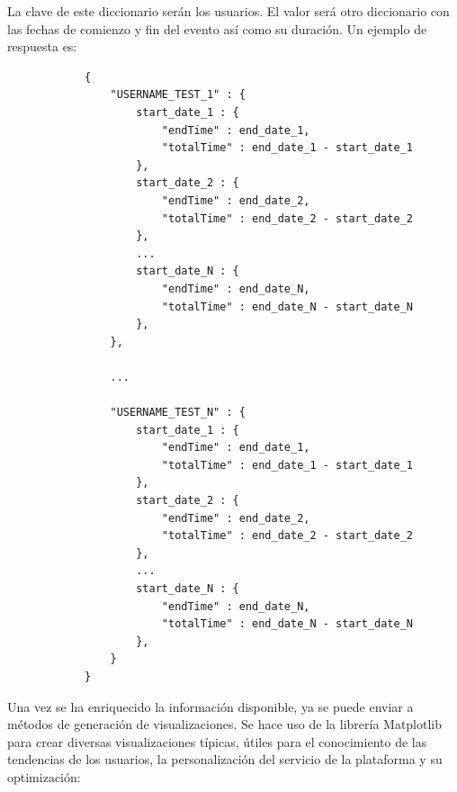 \documentclass[a4paper, 12pt]{book}
\begin{document}
		La clave de este diccionario serán los usuarios. El valor será otro diccionario con las fechas de comienzo y fin del evento así como su duración. Un ejemplo de respuesta es:
		
		{\footnotesize
		\begin{verbatim}
			{
			    "USERNAME_TEST_1" : {
			        start_date_1 : {
			            "endTime" : end_date_1,
			            "totalTime" : end_date_1 - start_date_1
			        },
			        start_date_2 : {
			            "endTime" : end_date_2,
			            "totalTime" : end_date_2 - start_date_2
			        },
			        ...
			        start_date_N : {
			            "endTime" : end_date_N,
			            "totalTime" : end_date_N - start_date_N
			        },
			    },
			    
			    ...
			    
			    "USERNAME_TEST_N" : {
			        start_date_1 : {
			            "endTime" : end_date_1,
			            "totalTime" : end_date_1 - start_date_1
			        },
			        start_date_2 : {
			            "endTime" : end_date_2,
			            "totalTime" : end_date_2 - start_date_2
			        },
			        ...
			        start_date_N : {
			            "endTime" : end_date_N,
			            "totalTime" : end_date_N - start_date_N
			        },
			    }
			}
		\end{verbatim}
		}
		Una vez se ha enriquecido la información disponible, ya se puede enviar a métodos de generación de visualizaciones. Se hace uso de la librería Matplotlib para crear diversas visualizaciones típicas, útiles para el conocimiento de las tendencias de los usuarios, la personalización del servicio de la plataforma y su optimización: \\
		
\end{document}
